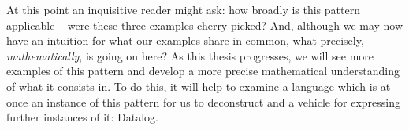 
At this point an inquisitive reader might ask: how broadly is this
pattern applicable -- were these three examples cherry-picked?
%
And, although we may now have an intuition for what our examples share in
common, what precisely, \emph{mathematically}, is going on here?
%
%
As this thesis progresses, we will see more examples of this pattern and develop a more precise mathematical understanding of what it consists in.
%
To do this, it will help to examine a language which is at once an instance of
this pattern for us to deconstruct and a vehicle for expressing further
instances of it: Datalog.







